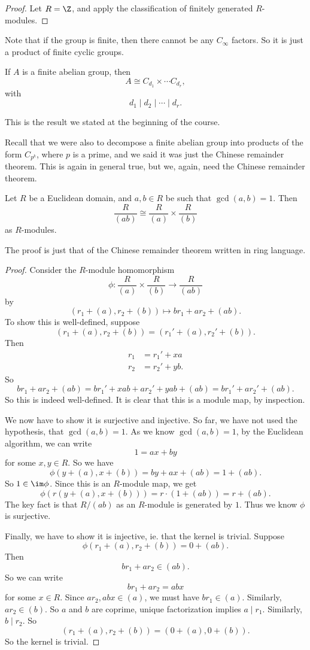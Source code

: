 \documentclass[a4paper]{article}
\begin{document}
\begin{proof}
  Let $R = \Z$, and apply the classification of finitely generated $R$-modules.
\end{proof}

Note that if the group is finite, then there cannot be any $C_\infty$ factors. So it is just a product of finite cyclic groups.
\begin{cor}
  If $A$ is a finite abelian group, then
  \[
    A \cong C_{d_1} \times \cdots C_{d_r},
  \]
  with
  \[
    d_1 \mid d_2 \mid \cdots \mid d_r.
  \]
\end{cor}
This is the result we stated at the beginning of the course.

Recall that we were also to decompose a finite abelian group into products of the form $C_{p^k}$, where $p$ is a prime, and we said it was just the Chinese remainder theorem. This is again in general true, but we, again, need the Chinese remainder theorem.

\begin{lemma}
  Let $R$ be a Euclidean domain, and $a, b \in R$ be such that $\gcd(a, b) = 1$. Then
  \[
    \frac{R}{(ab)} \cong \frac{R}{(a)} \times \frac{R}{(b)}
  \]
  as $R$-modules.
\end{lemma}
The proof is just that of the Chinese remainder theorem written in ring language.
\begin{proof}
  Consider the $R$-module homomorphism
  \[
    \phi: \frac{R}{(a)} \times \frac{R}{(b)} \to \frac{R}{(ab)}
  \]
  by
  \[
    (r_1 + (a), r_2 + (b)) \mapsto br_1 + ar_2 + (ab).
  \]
  To show this is well-defined, suppose
  \[
    (r_1 + (a), r_2 + (b)) = (r_1' + (a), r_2' + (b)).
  \]
  Then
  \begin{align*}
    r_1 &= r_1' + xa\\
    r_2 &= r_2' + yb.
  \end{align*}
  So
  \[
    br_1 + ar_2 + (ab) = br_1' + x ab + a r_2' + yab + (ab) = br_1' + ar_2' + (ab).
  \]
  So this is indeed well-defined. It is clear that this is a module map, by inspection.

  We now have to show it is surjective and injective. So far, we have not used the hypothesis, that $\gcd(a, b) = 1$. As we know $\gcd(a, b) = 1$, by the Euclidean algorithm, we can write
  \[
    1 = ax + by
  \]
  for some $x, y \in R$. So we have
  \[
    \phi(y + (a), x + (b)) = by + ax + (ab) = 1 + (ab).
  \]
  So $1 \in \im \phi$. Since this is an $R$-module map, we get
  \[
    \phi(r (y + (a), x + (b))) = r \cdot (1 + (ab)) = r + (ab).
  \]
  The key fact is that $R/(ab)$ as an $R$-module is generated by $1$. Thus we know $\phi$ is surjective.

  Finally, we have to show it is injective, ie. that the kernel is trivial. Suppose
  \[
    \phi(r_1 + (a), r_2 + (b)) = 0 + (ab).
  \]
  Then
  \[
    br_1 + a r_2 \in (ab).
  \]
  So we can write
  \[
    br_1 + ar_2 = abx
  \]
  for some $x \in R$. Since $a r_2, abx \in (a)$, we must have $br_1 \in (a)$. Similarly, $ar_2 \in (b)$. So $a$ and $b$ are coprime, unique factorization implies $a \mid r_1$. Similarly, $b \mid r_2$. So
  \[
    (r_1 + (a), r_2 + (b))= (0 + (a), 0 + (b)).
  \]
  So the kernel is trivial.
\end{proof}
\end{document}
